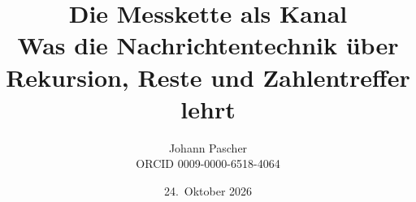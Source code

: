 \documentclass[11pt,a4paper]{report}
\title{Die Messkette als Kanal\\[0.5em]
  \large Was die Nachrichtentechnik über Rekursion, Reste und Zahlentreffer lehrt}
\date{24.~Oktober 2026}
\author{Johann Pascher\\\small ORCID 0009-0000-6518-4064}
\begin{document}
\renewcommand{\thechapter}{}
\renewcommand{\thesection}{\arabic{section}}
\maketitle
\tableofcontents

\end{document}

